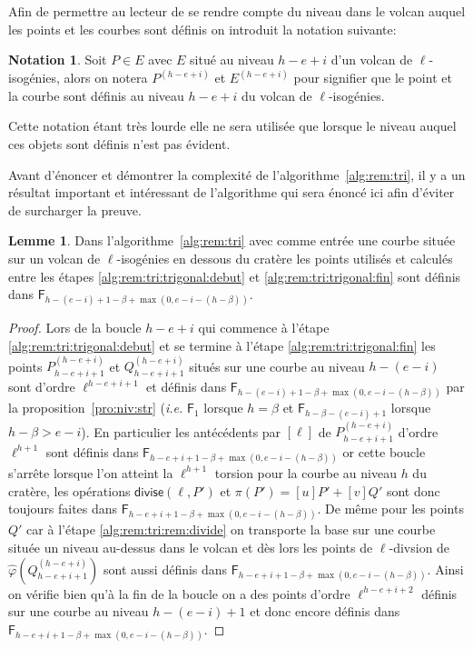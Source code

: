 \documentclass[10pt,a4paper]{book}
\theoremstyle{plain}
\theoremstyle{definition}
\newtheorem{lem}[thm]{Lemme}
\theoremstyle{definition}
\theoremstyle{definition}
\theoremstyle{definition}
\theoremstyle{remark}
\theoremstyle{remark}
\theoremstyle{definition}
\newtheorem{nota}[thm]{Notation}
\begin{document}
Afin de permettre au lecteur de se rendre compte du niveau dans le volcan 
auquel les points et les courbes sont définis on introduit la notation suivante:
\begin{nota}
Soit $P \in E$ avec $E$ situé au niveau $h-e+i$ d'un volcan de $\ell$-isogénies, alors on notera $P^{(h-e+i)}$ et $E^{(h-e+i)}$ pour signifier que le point et la courbe sont définis au niveau $h-e+i$ du volcan de $\ell$-isogénies.
\end{nota}
Cette notation étant très lourde elle ne sera utilisée que lorsque le niveau 
auquel ces objets sont définis n'est pas évident.

Avant d'énoncer et démontrer la complexité de l'algorithme~\ref{alg:rem:tri}, 
il y a un résultat important et intéressant de l'algorithme qui sera énoncé ici
afin d'éviter de surcharger la preuve.

\begin{lem}
\label{lem:alg:rat}
Dans l'algorithme~\ref{alg:rem:tri} avec comme entrée une courbe située sur un 
volcan de $\ell$-isogénies en dessous du cratère les points utilisés et 
calculés entre les étapes \ref{alg:rem:tri:trigonal:debut} et 
\ref{alg:rem:tri:trigonal:fin} sont définis dans $\mathsf{F}_{h-(e-i)+1-\beta+
\max(0,e-i-(h-\beta))}$.
\end{lem}

\begin{proof}
Lors de la boucle $h-e+i$ qui commence à l'étape \ref{alg:rem:tri:trigonal:debut} 
et se termine à l'étape \ref{alg:rem:tri:trigonal:fin} les points $P_{h-e+i+1}^{(h-e+i)}$ et 
$Q_{h-e+i+1}^{(h-e+i)}$ situés sur une courbe au niveau $h-(e-i)$ sont d'ordre 
$\ell^{h-e+i+1}$ et définis dans $\mathsf{F}_{h-(e-i)+1-\beta+
\max(0,e-i-(h-\beta))}$ par la proposition~\ref{pro:niv:str} (\emph{i.e.} 
$\mathsf{F}_{1}$ lorsque $h=\beta$ et $\mathsf{F}_{h-\beta-(e-i)+1}$ lorsque 
$h-\beta>e-i$). En particulier les antécédents par $[\ell]$ de $P_{h-e+i+1}^
{(h-e+i)}$ d'ordre $\ell^{h+1}$ sont définis dans $\mathsf{F}_{h-e+i+1-\beta+
\max(0,e-i-(h-\beta))}$ or cette boucle s'arrête lorsque l'on atteint la 
$\ell^{h+1}$ torsion pour la courbe au niveau $h$ du cratère, les opérations 
$\mathsf{divise}(\ell, P')$ et $\pi(P')=[u]P'+[v]Q'$ sont donc toujours faites
dans $\mathsf{F}_{h-e+i+1-\beta+\max(0,e-i-(h-\beta))}$. De même pour les 
points $Q'$ car à l'étape \ref{alg:rem:tri:rem:divide} on transporte la base 
sur une courbe située un niveau au-dessus dans le volcan et dès lors les points
de $\ell$-divsion de $\widehat{\varphi}(Q_{h-e+i+1}^{(h-e+i)})$ sont aussi 
définis dans $\mathsf{F}_{h-e+i+1-\beta+\max(0,e-i-(h-\beta))}$. Ainsi on 
vérifie bien qu'à la fin de la boucle on a des points d'ordre $\ell^{h-e+i+2}$ 
définis sur une courbe au niveau $h-(e-i)+1$ et donc encore définis dans 
$\mathsf{F}_{h-e+i+1-\beta+\max(0,e-i-(h-\beta))}$.
\end{proof}
\end{document}
